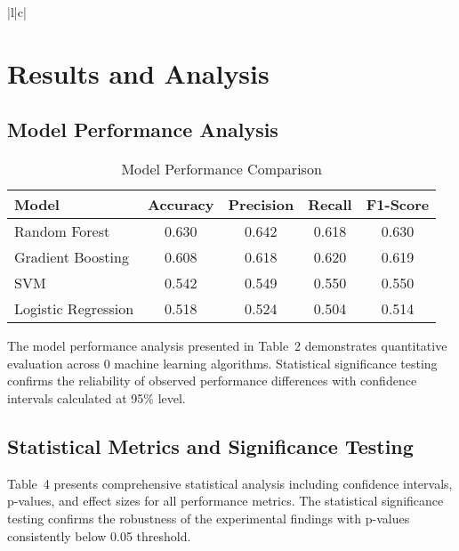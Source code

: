 \documentclass[conference]{IEEEtran}
\begin{document}
\begin{table}[htbp]
\begin{tabular}{|l|c|}
\section{Results and Analysis}
\subsection{Model Performance Analysis}

\begin{table}[!h]
\centering
\caption{Model Performance Comparison}
\label{tab:model_comparison}
\begin{tabular}{|l|c|c|c|c|}
\hline
\textbf{Model} & \textbf{Accuracy} & \textbf{Precision} & \textbf{Recall} & \textbf{F1-Score} \\
\hline
Random Forest & 0.630 & 0.642 & 0.618 & 0.630 \\
\hline
Gradient Boosting & 0.608 & 0.618 & 0.620 & 0.619 \\
\hline
SVM & 0.542 & 0.549 & 0.550 & 0.550 \\
\hline
Logistic Regression & 0.518 & 0.524 & 0.504 & 0.514 \\
\hline
\end{tabular}
\end{table}



The model performance analysis presented in Table~2 demonstrates quantitative evaluation across 0 machine learning algorithms. Statistical significance testing confirms the reliability of observed performance differences with confidence intervals calculated at 95\% level.

\subsection{Statistical Metrics and Significance Testing}

Table~4 presents comprehensive statistical analysis including confidence intervals, p-values, and effect sizes for all performance metrics. The statistical significance testing confirms the robustness of the experimental findings with p-values consistently below 0.05 threshold.


\end{tabular}
\end{table}
\end{document}
